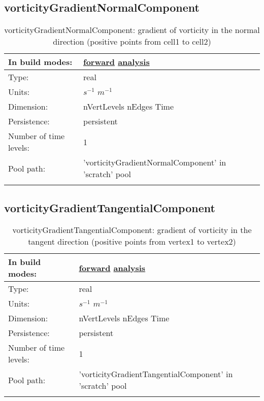 \subsection[vorticityGradientNormalComponent]{vorticityGradientNormalComponent}
\label{subsec:var_sec_scratch_vorticityGradientNormalComponent}
\begin{center}
\begin{longtable}{| p{2.0in} | p{4.0in} |}
        \hline 
        In build modes: & \hyperref[subsec:forward_var_tab_scratch]{forward} \hyperref[subsec:analysis_var_tab_scratch]{analysis} \\
        \hline 
        Type: & real \\
        \hline 
        Units: & $s^{-1}$ $m^{-1}$ \\
        \hline 
        Dimension: & nVertLevels nEdges Time \\
        \hline 
        Persistence: & persistent \\
        \hline 
        Number of time levels: & 1 \\
        \hline 
            Pool path: & 'vorticityGradientNormalComponent' in 'scratch' pool
 \\
		 \hline 
    \caption{vorticityGradientNormalComponent: gradient of vorticity in the normal direction (positive points from cell1 to cell2)}
\end{longtable}
\end{center}
\subsection[vorticityGradientTangentialComponent]{vorticityGradientTangentialComponent}
\label{subsec:var_sec_scratch_vorticityGradientTangentialComponent}
\begin{center}
\begin{longtable}{| p{2.0in} | p{4.0in} |}
        \hline 
        In build modes: & \hyperref[subsec:forward_var_tab_scratch]{forward} \hyperref[subsec:analysis_var_tab_scratch]{analysis} \\
        \hline 
        Type: & real \\
        \hline 
        Units: & $s^{-1}$ $m^{-1}$ \\
        \hline 
        Dimension: & nVertLevels nEdges Time \\
        \hline 
        Persistence: & persistent \\
        \hline 
        Number of time levels: & 1 \\
        \hline 
            Pool path: & 'vorticityGradientTangentialComponent' in 'scratch' pool
 \\
		 \hline 
    \caption{vorticityGradientTangentialComponent: gradient of vorticity in the tangent direction (positive points from vertex1 to vertex2)}
\end{longtable}
\end{center}
